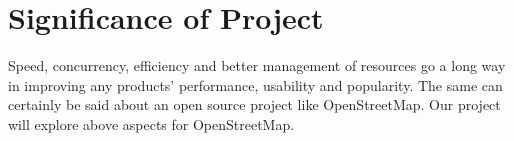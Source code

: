 \section{Significance of Project}
Speed, concurrency, efficiency and better management of resources go a long way in improving any products' performance, usability and popularity. The same can certainly be said about an open source project like OpenStreetMap.
Our project will explore above aspects for OpenStreetMap.
